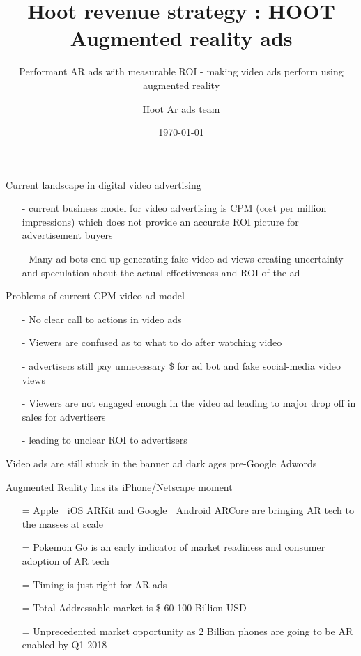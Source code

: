\documentclass[12pt]{beamer}
\title{ Hoot revenue strategy : HOOT Augmented reality ads}
\subtitle{Performant AR ads with measurable ROI  - making video ads perform using augmented reality}
\date{\today}
\author{Hoot Ar ads team}
\institute{Hoot Live inc., a Delaware C-corp}
\begin{document}
\maketitle



\begin{frame}[fragile]{Current landscape in digital video advertising}

\begin{itemize}
\item[-]current business model for video advertising is CPM (cost per million impressions) which does not provide an accurate ROI picture for advertisement buyers
  \pause
\item[-]Many ad-bots end up generating fake video ad views creating uncertainty and speculation about the actual effectiveness and ROI of the ad
\end{itemize}

\end{frame}
\begin{frame}[t]{Problems of current CPM video ad model}
\begin{itemize}
\item[-]No clear call to actions in video ads
\pause
\item[-]Viewers are confused as to what to do after watching video
\pause
\item[-]advertisers still pay unnecessary \$ for ad bot  and fake social-media video views
\pause
\item[-]Viewers are not engaged enough in the video ad leading to  major drop off in sales for advertisers
\pause
\item[-]leading to unclear ROI to advertisers
\end{itemize}
\pause
Video ads are still stuck in the banner ad dark ages pre-Google Adwords

\end{frame}
\begin{frame}[t]{Augmented Reality has its iPhone/Netscape moment}
\begin{itemize}
	\item[=]Apple 🍎
	 iOS ARKit and Google 🤖 Android ARCore are bringing AR tech to the masses at scale
	\pause
	\item[=]Pokemon Go is an early indicator of market readiness and consumer adoption of AR tech
	\pause
	\item[=]Timing is just right for AR ads
	\pause
	\item[=]Total Addressable market is \$ 60-100 Billion USD 
	\pause
	\item[=]Unprecedented market opportunity as 2 Billion phones are going to be AR enabled by Q1 2018
\end{itemize}
\end{frame}
\end{document}
